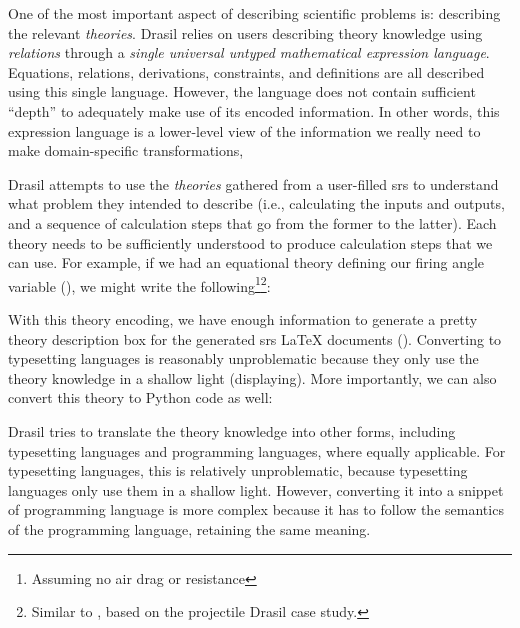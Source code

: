 One of the most important aspect of describing scientific problems is:
describing the relevant \textit{theories}. Drasil relies on users describing
theory knowledge using \textit{relations} through a \textit{single universal
      untyped mathematical expression language}. Equations, relations, derivations,
constraints, and definitions are all described using this single language.
However, the language does not contain sufficient ``depth'' to adequately make
use of its encoded information. In other words, this expression language is a
lower-level view of the information we really need to make domain-specific
transformations,

Drasil attempts to use the \textit{theories} gathered from a user-filled
\acs{srs} to understand what problem they intended to describe (i.e.,
calculating the inputs and outputs, and a sequence of calculation steps that go
from the former to the latter). Each theory needs to be sufficiently understood
to produce calculation steps that we can use. For example, if we had an
equational theory defining our firing angle variable
(), we might write the
following\footnote{Assuming no air drag or resistance}\footnote{Similar to
      , based on the \acs{projectile} Drasil case
      study.}:

\exampleAngleEquationEncoding{}

With this theory encoding, we have enough information to generate a pretty
theory description box for the generated \acs{srs} \LaTeX{} documents
(). Converting to typesetting languages
is reasonably unproblematic because they only use the theory knowledge in a
shallow light (displaying). More importantly, we can also convert this theory to
Python code as well:

\exampleAngleEquationEncodingToPython{}

Drasil tries to translate the theory knowledge into other forms, including
typesetting languages and programming languages, where equally applicable. For
typesetting languages, this is relatively unproblematic, because typesetting
languages only use them in a shallow light. However, converting it into a
snippet of programming language is more complex because it has to follow the
semantics of the programming language, retaining the same meaning.

